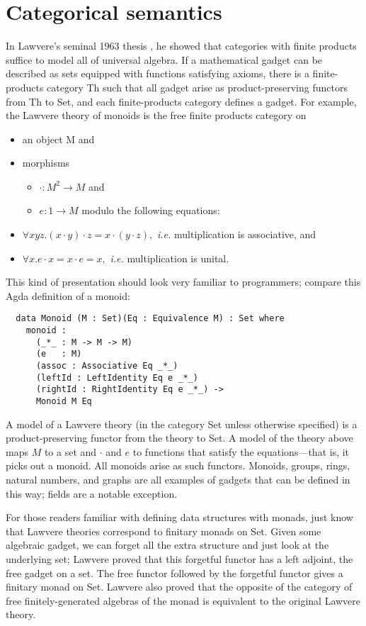 \documentclass[submission,copyright,creativecommons]{eptcs}
\newcommand{\maps}{\colon}
\begin{document}
\section{Categorical semantics}

In Lawvere's seminal 1963 thesis \cite{Lawvere}, he showed that categories with finite products suffice to model all of universal algebra.  If a mathematical gadget can be described as sets equipped with functions satisfying axioms, there is a finite-products category Th such that all gadget arise as product-preserving functors from Th to Set, and each finite-products category defines a gadget.  For example, the Lawvere theory of monoids is the free finite products category on
\begin{itemize}
  \item an object M and
  \item morphisms 
  \begin{itemize}
    \item $\cdot\maps M^2 \to M$ and
    \item $e\maps 1 \to M$ modulo the following equations:
  \end{itemize}
  \item $\forall xyz.(x\cdot y)\cdot z = x\cdot(y\cdot z),$ {\em i.e.} multiplication is associative, and
  \item $\forall x.e \cdot x = x\cdot e = x,$ {\em i.e.} multiplication is unital.
\end{itemize}
This kind of presentation should look very familiar to programmers; compare this Agda definition of a monoid:
\begin{verbatim}
  data Monoid (M : Set)(Eq : Equivalence M) : Set where
    monoid :
      (_*_ : M -> M -> M)
      (e   : M)
      (assoc : Associative Eq _*_)
      (leftId : LeftIdentity Eq e _*_)
      (rightId : RightIdentity Eq e _*_) ->
      Monoid M Eq
\end{verbatim}

A model of a Lawvere theory (in the category Set unless otherwise specified) is a product-preserving functor from the theory to Set.  A model of the theory above maps $M$ to a set and $\cdot$ and $e$ to functions that satisfy the equations---that is, it picks out a monoid.  All monoids arise as such functors. Monoids, groups, rings, natural numbers, and graphs are all examples of gadgets that can be defined in this way; fields are a notable exception.  

For those readers familiar with defining data structures with monads, just know that Lawvere theories correspond to finitary monads on Set.  Given some algebraic gadget, we can forget all the extra structure and just look at the underlying set; Lawvere proved that this forgetful functor has a left adjoint, the free gadget on a set.  The free functor followed by the forgetful functor gives a finitary monad on Set.  Lawvere also proved that the opposite of the category of free finitely-generated algebras of the monad is equivalent to the original Lawvere theory.
\end{document}
